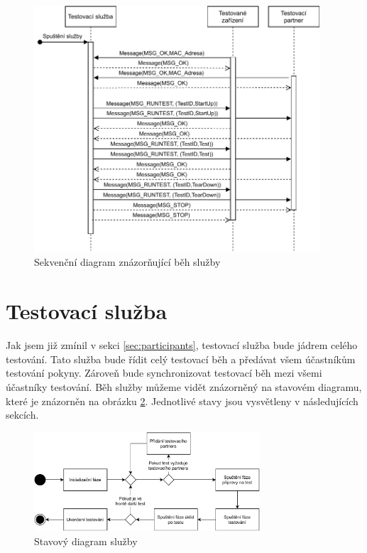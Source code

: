 \begin{figure}[htbp]
    \centering 
    \includegraphics[width=0.95\textwidth]{assets/img/sequencediagram.pdf}
    \caption{Sekvenční diagram znázorňující běh služby}
    \label{fig:seqdiag}
\end{figure}

\section{Testovací služba}
Jak jsem již zmínil v sekci \ref{sec:participants}, testovací služba bude jádrem celého testování. Tato služba bude řídit celý testovací běh a předávat všem účastníkům testování pokyny. Zároveň bude synchronizovat testovací běh mezi všemi účastníky testování. Běh služby můžeme vidět znázorněný na stavovém diagramu, které je znázorněn na obrázku \ref{fig:statediag}. Jednotlivé stavy jsou vysvětleny v následujících sekcích. 

\begin{figure}[htbp]
    \centering 
    \includegraphics[width=0.75\textwidth]{assets/img/servicestatediagram.pdf}
    \caption{Stavový diagram služby}
    \label{fig:statediag}
\end{figure}

